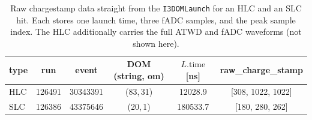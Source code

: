 \begin{table}[h]
  \centering
  \caption{Raw chargestamp data straight from the \texttt{I3DOMLaunch} for an
           HLC and an SLC hit. Each stores one launch time, three fADC
           samples, and the peak sample index. The HLC additionally carries
           the full ATWD and fADC waveforms (not shown here).}
  \label{tab:chargestamp_raw}
  \begin{tabular}{l c c c c c}
    \toprule
    type & run & event & DOM (string, om) & $L.\text{time}$ [ns] & raw\_charge\_stamp \\
    \midrule
    HLC & 126491 & 30343391 & (83,\,31) & 12028.9 & [308, 1022, 1022] \\
    SLC & 126386 & 43375646 & (20,\,1) & 180533.7 & [180, 280, 262] \\
    \bottomrule
  \end{tabular}
\end{table}
